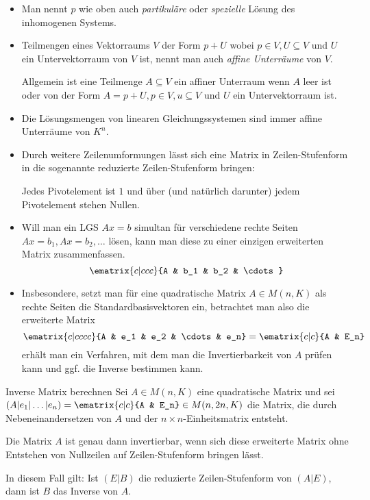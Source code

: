 \bemerkung
\begin{itemize}
	\item Man nennt $p$ wie oben auch \emph{partikuläre} oder \emph{spezielle} Lösung des inhomogenen Systems.
	\item Teilmengen eines Vektorraums $V$ der Form $p+U$ wobei $p\in V, U\subseteq V$ und $U$ ein Untervektorraum von $V$ ist, nennt man auch \emph{affine Unterräume} von $V$.

	Allgemein ist eine Teilmenge $A\subseteq V$ ein affiner Unterraum wenn $A$ leer ist oder von der Form $A=p+U, p\in V, u\subseteq V$ und $U$ ein Untervektorraum ist.
	\item Die Lösungsmengen von linearen Gleichungssystemen sind immer affine Unterräume von $K^n$.
	\item Durch weitere Zeilenumformungen lässt sich eine Matrix in Zeilen-Stufenform in die sogenannte reduzierte Zeilen-Stufenform bringen:

	Jedes Pivotelement ist $1$ und über (und natürlich darunter) jedem Pivotelement stehen Nullen.
	\item Will man ein LGS $Ax=b$ simultan für verschiedene rechte Seiten $Ax=b_1, Ax=b_2, \ldots$ lösen, kann man diese zu einer einzigen erweiterten Matrix zusammenfassen.
	\begin{equation*}
		\ematrix{c|ccc}{A & b_1 & b_2 & \cdots}
	\end{equation*}
	\item Insbesondere, setzt man für eine quadratische Matrix $A\in M(n,K)$ als rechte Seiten die Standardbasisvektoren ein, betrachtet man also die erweiterte Matrix
	\begin{equation*}
		\ematrix{c|cccc}{A & e_1 & e_2 & \cdots & e_n} = \ematrix{c|c}{A & E_n}
	\end{equation*}
	erhält man ein Verfahren, mit dem man die Invertierbarkeit von $A$ prüfen kann und ggf. die Inverse bestimmen kann.
\end{itemize}


\begin{satz}{Inverse Matrix berechnen}
	Sei $A\in M(n,K)$ eine quadratische Matrix und sei $(A|e_1|\ldots|e_n)=\ematrix{c|c}{A & E_n}\in M(n,2n,K)$ die Matrix, die durch Nebeneinandersetzen von $A$ und der $n\times n$-Einheitsmatrix entsteht.

	Die Matrix $A$ ist genau dann invertierbar, wenn sich diese erweiterte Matrix ohne Entstehen von Nullzeilen auf Zeilen-Stufenform bringen lässt.

	In diesem Fall gilt: Ist $(E|B)$ die reduzierte Zeilen-Stufenform von $(A|E)$, dann ist $B$ das Inverse von $A$.
\end{satz}
